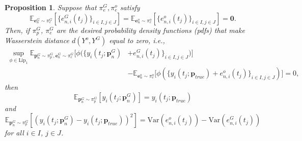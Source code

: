 \documentclass[letterpaper]{article} %
\theoremstyle{thmstyleone}%
\newtheorem{proposition}[theorem]{Proposition}%
\theoremstyle{thmstyletwo}%
\theoremstyle{thmstylethree}%
\begin{document}
\begin{proposition}\label{gan2} Suppose that $\pi_{e}^{G},\pi_{e}^{o}$ satisfy \[ \mathbb{E}_{\mathbf{e}_{n}^{G} \sim \pi_{e}^{G}}[\{e_{n,i}^{G}(t_{j})\}_{i\in I, j \in J}] = \mathbb{E}_{\mathbf{e}_{n}^{o} \sim \pi_{e}^{o}}[\{e_{n,i}^{o}(t_{j})\}_{i\in I, j \in J}] = \mathbf{0}.\] Then, if $\pi_{p}^{G}$, $\pi_{e}^{G}$ are the desired probability density functions (pdfs) that make Wasserstein distance $d(Y^{o},Y^{G})$ equal to zero, i.e.,
\begin{align*}
\sup_{\phi \in \mathrm{Lip}_{1}}\mathbb{E}_{\mathbf{p}_{n}^{G} \sim \pi_{p}^{G}, \mathbf{e}_{n}^{G} \sim \pi_{e}^{G}}\bigg[\phi (\{y_{i}(t_{j};\mathbf{p}_{n}^{G})&+e_{n,i}^{G}(t_{j})\}_{i\in I,j\in J})\bigg]\\
& - \mathbb{E}_{\mathbf{e}_{n}^{o} \sim \pi_{e}^{o}}\bigg[\phi (\{y_{i}(t_{j};\mathbf{p}_{true})+e_{n,i}^{o}(t_{j})\}_{i\in I,j\in J}) \bigg] = 0,
\end{align*}
 then \[\mathbb{E}_{\mathbf{p}_{n}^{G} \sim \pi_{p}^{G}}[y_{i}(t_{j};\mathbf{p}_{n}^{G})] = y_{i}(t_{j};\mathbf{p}_{true})\] and \[ \mathbb{E}_{\mathbf{p}_{n}^{G} \sim \pi_{p}^{G}}[(y_{i}(t_{j};\mathbf{p}_{n}^{G})-y_{i}(t_{j};\mathbf{p}_{true}))^{2}] = \text{Var}(e_{n,i}^{o}(t_{j}))-\text{Var}(e_{n,i}^{G}(t_{j}))\] for all $i \in I$, $j \in J$.
\end{proposition}
\end{document}
